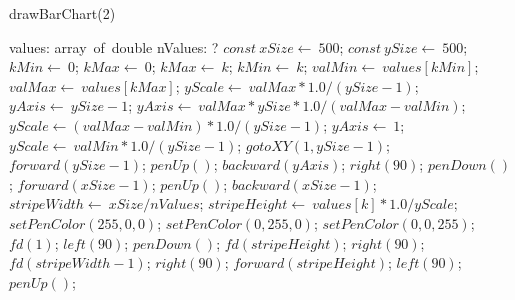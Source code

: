 \documentclass[a4paper,10pt]{article}
\begin{document}
\begin{algorithm}
\caption{drawBarChart(2)}
\begin{algorithmic}[5]
\State {}
\State {}
\State {}
\State {}
    \State values: array\ of\ double
    \State nValues: ?
  \EndDecl
  \State \(const\ xSize\gets\ 500\);
  \State \(const\ ySize\gets\ 500\);
  \State \(kMin\gets\ 0\);
  \State \(kMax\gets\ 0\);
      \State \(kMax\gets\ k\);
    \Else
        \State \(kMin\gets\ k\);
      \EndIf
    \EndIf
  \EndFor
  \State \(valMin\gets\ values[kMin]\);
  \State \(valMax\gets\ values[kMax]\);
  \State \(yScale\gets\ valMax*1.0/(ySize-1)\);
  \State \(yAxis\gets\ ySize-1\);
      \State \(yAxis\gets\ valMax*ySize*1.0/(valMax-valMin)\);
      \State \(yScale\gets(valMax-valMin)*1.0/(ySize-1)\);
    \Else
      \State \(yAxis\gets\ 1\);
      \State \(yScale\gets\ valMin*1.0/(ySize-1)\);
    \EndIf
  \EndIf
  \State \(gotoXY(1,ySize-1)\);
  \State \(forward(ySize-1)\);
  \State \(penUp()\);
  \State \(backward(yAxis)\);
  \State \(right(90)\);
  \State \(penDown()\);
  \State \(forward(xSize-1)\);
  \State \(penUp()\);
  \State \(backward(xSize-1)\);
  \State \(stripeWidth\gets\ xSize/nValues\);
    \State \(stripeHeight\gets\ values[k]*1.0/yScale\);
        \State \(setPenColor(255,0,0)\);
      \EndSelector
        \State \(setPenColor(0,255,0)\);
      \EndSelector
        \State \(setPenColor(0,0,255)\);
      \EndSelector
    \EndCase
    \State \(fd(1)\);
    \State \(left(90)\);
    \State \(penDown()\);
    \State \(fd(stripeHeight)\);
    \State \(right(90)\);
    \State \(fd(stripeWidth-1)\);
    \State \(right(90)\);
    \State \(forward(stripeHeight)\);
    \State \(left(90)\);
    \State \(penUp()\);
  \EndFor
\EndProcedure
\end{algorithmic}
\end{algorithm}
\end{document}
